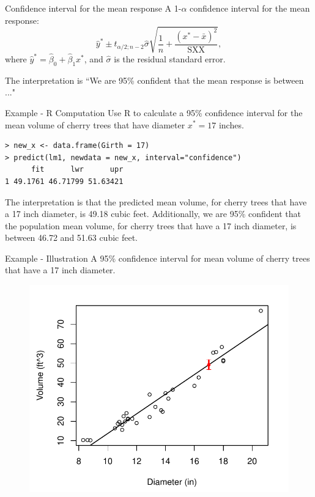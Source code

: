 \documentclass[10pt]{beamer}
\begin{document}
\begin{frame}{Confidence interval for the mean response}
A 1-$\alpha$ confidence interval for the mean response:
$$\hat{y}^* \pm t_{\alpha/2; n-2} \hat{\sigma} \sqrt{\frac{1}{n} + \frac{(x^* - \bar{x})^2}{ \text{SXX}}},$$
where $\hat{y}^* = \hat{\beta}_0 + \hat{\beta}_1 x^*$, and $\hat{\sigma}$ is the residual standard error.\\
\vspace{15pt}

The interpretation is ``We are 95\% confident that the mean response is between ..."
\end{frame}

\begin{frame}[fragile]{Example - R Computation}
Use R to calculate a 95\% confidence interval for the mean volume of cherry trees that have diameter $x^* = 17$ inches.

\begin{verbatim}
> new_x <- data.frame(Girth = 17)
> predict(lm1, newdata = new_x, interval="confidence")
      fit      lwr      upr
1 49.1761 46.71799 51.63421
\end{verbatim}

The interpretation is that the predicted mean volume, for cherry trees that have a 17 inch diameter, is 49.18 cubic feet.  Additionally, we are 95\% confident that the population mean volume, for cherry trees that have a 17 inch diameter, is between 46.72 and 51.63 cubic feet.    
\end{frame}

\begin{frame}{Example - Illustration}
A 95\% confidence interval for mean volume of cherry trees that have a 17 inch diameter. 
\begin{figure}
\includegraphics[scale=0.65]{figure/scatter4.pdf}
\end{figure}
\end{frame}
\end{document}
